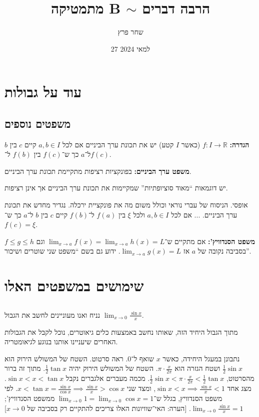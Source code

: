 \documentclass[]{article}
\author{שחר פרץ}
\title{מתמטיקה B $\sim$ הרבה דברים}
\date{27 למאי 2024}
\newcommand\R     {\mathbb{R}}
\newcommand\cosx  {\cos x}
\newcommand\sinx  {\sin x}
\newcommand\tanx  {\tan x}
\newcommand\limz  {\lim_{x \to 0}}
\begin{document}
	\maketitle
	\section{עוד על גבולות}
	\subsection{משפטים נוספים}
	\textbf{הגדרה: }$f \colon I \to \R$ (כאשר $I $ קטע) יש את תכונת ערך הביניים אם לכל $a, b \in I$ קיים $c$ בין $b$ ל־$a$ כך ש־$f(c)$ בין $f(b)$ ל־$f(c)$. 
	
	\textbf{משפט ערך הביניים: }בפונקציות רציפות מתקיימת תכונת ערך הביניים. 
	
	יש דוגמאות ``מאוד סוציופתיות'' שמקיימות את תכונת ערך הביניים אך אינן רציפות. 
	
	אופסי. הניסוח של עברי נוראי וכולל משום מה את פונקציית ירכלה. נגדיר מחדש את תכונת ערך הביניים. 
	... אם לכל $a, b \in I$ ולכל $\xi$ בין $f(a)$ ל־$f(b)$ קיים $c$ בין $b$ ל־$a$ כך ש־$f(c) = \xi $. 
	
	\textbf{משפט הסנדוויץ': }אם מתקיים ש־$\lim_{x \to a} f(x) = \lim_{x \to a} h(x) = L$ וגם $f \le g \le h$ בסביבה נקובה של $a$ אז $\lim_{x \to a} g(x) = L$. ידוע גם בשם ``משפט שני שוטרים ושיכור''. 
	
	\section{שימושים במשפטים האלו}
	\subsection{}
	נניח ואנו מעוניינים לחשב את הגבול $\lim_{x \to 0} \frac{\sinx}{x}$. 
	
	מתוך הגבול היחיד הזה, שאותו נחשב באמצעות כלים גיאוטרים, נוכל לקבל את הגבולות האחרים שיעניינו אותנו בנוגע לגיאומטריה. 
	
	נתבונן במעגל היחידה, כאשר $x$ שואף ל־$0$. ראה סרטוט. השטח של המשולש הירוק הוא $\frac{1}{2} \sinx $ ושטח הגזרה הוא $\pi \cdot \frac{x}{2\pi}$. השטח של המשולש הירוק יהיה $\frac{1}{2}\tanx$. מתוך זה ברור מהסרטוט, $\frac{1}{2} \sinx < \pi \cdot \frac{x}{2\pi } < \frac{1}{2} \tanx$. מכמה מעברים אלגברים נקבל $\sinx < x < \tanx$. מצג אחד $\sinx <x \implies \frac{\sinx}{x} < 1 $, ומצד שני $x < \tanx  = \frac{\sinx}{\cosx} \implies \frac{\sinx}{x} > \cosx$. לפי משפט הסנדוויץ, בגלל ש־$\limz 1 = \limz \cosx = 1$ ממשפט הסנדוויץ'; $\limz \frac{\sinx}{x} = 1 $. [הערה: האי־שוויונות האלו צריכים להתקיים רק בסביבה של $x \to 0$]
	
\end{document}
